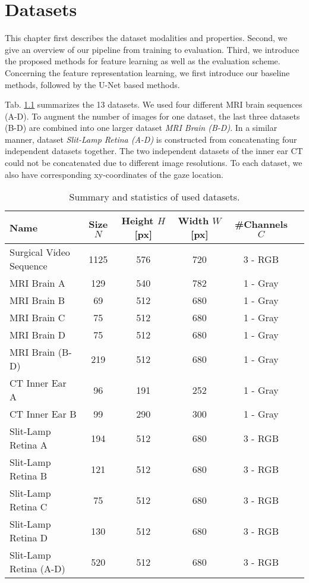 \chapter{Datasets}

\label{datasets} %

This chapter first describes the dataset modalities and properties.
Second, we give an overview of our pipeline from training to evaluation.
Third, we introduce the proposed methods for feature learning as well as the evaluation scheme.
Concerning the feature representation learning, we first introduce our baseline methods, followed by the U-Net based methods.

Tab. \ref{tab:dataset_stat} summarizes the 13 datasets. We used four different MRI brain sequences (A-D). To augment the number of images for one dataset, the last three datasets (B-D) are combined into one larger dataset \textit{MRI Brain (B-D)}. In a similar manner, dataset \textit{Slit-Lamp Retina (A-D)} is constructed from concatenating four independent datasets together. The two independent datasets of the inner ear CT could not be concatenated due to different image resolutions. To each dataset, we also have corresponding xy-coordinates of the gaze location.

\begin{table}[ht]
   \centering
   \caption[Dataset statistics]{Summary and statistics of used datasets.}
   \begin{tabular}{l|c|c|c|c|c}
      \toprule
      \textbf{Name} & \textbf{Size $N$} & \textbf{Height $H$ [px]} & \textbf{Width $W$ [px]} & \textbf{\#Channels $C$} \\
      \midrule
      Surgical Video Sequence & 1125 & 576 & 720 & 3 - RGB \\
      \midrule
      MRI Brain A & 129 & 540 & 782 & 1 - Gray \\
      MRI Brain B & 69 & 512 & 680 & 1 - Gray \\
      MRI Brain C & 75 & 512 & 680 & 1 - Gray \\
      MRI Brain D & 75 & 512 & 680 & 1 - Gray \\
      MRI Brain (B-D) & 219 & 512 & 680 & 1 - Gray \\
      \midrule
      CT Inner Ear A & 96 & 191 & 252 & 1 - Gray \\
      CT Inner Ear B & 99 & 290 & 300 & 1 - Gray \\
      \midrule
      Slit-Lamp Retina A & 194 & 512 & 680 & 3 - RGB \\
      Slit-Lamp Retina B & 121 & 512 & 680 & 3 - RGB \\
      Slit-Lamp Retina C & 75 & 512 & 680 & 3 - RGB \\
      Slit-Lamp Retina D & 130 & 512 & 680 & 3 - RGB \\
      Slit-Lamp Retina (A-D) & 520 & 512 & 680 & 3 - RGB \\
      \bottomrule
   \end{tabular}
   \label{tab:dataset_stat}
\end{table}

